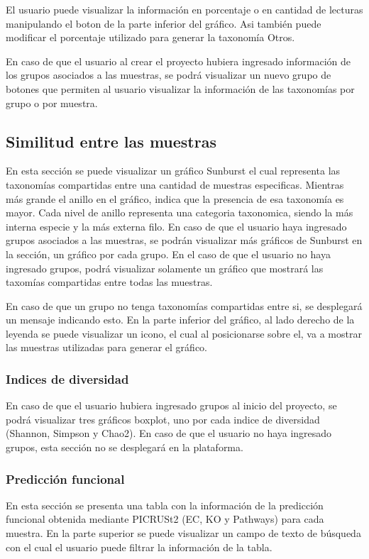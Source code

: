 El usuario puede visualizar la información en porcentaje o en cantidad de lecturas manipulando el boton de la parte inferior del gráfico. Asi también puede modificar el porcentaje utilizado para generar la taxonomía Otros.

En caso de que el usuario al crear el proyecto hubiera ingresado información de los grupos asociados a las muestras, se podrá visualizar un nuevo grupo de botones que permiten al usuario visualizar la información de las taxonomías por grupo o por muestra.
\subsection{Similitud entre las muestras}
En esta sección se puede visualizar un gráfico Sunburst el cual representa las taxonomías compartidas entre una cantidad de muestras especificas. Mientras más grande el anillo en el gráfico, indica que la presencia de esa taxonomía es mayor. Cada nivel de anillo representa una categoria taxonomica, siendo la más interna especie y la más externa filo.
En caso de que el usuario haya ingresado grupos asociados a las muestras, se podrán visualizar más gráficos de Sunburst en la sección, un gráfico por cada grupo. En el caso de que el usuario no haya ingresado grupos, podrá visualizar solamente un gráfico que mostrará las taxomías compartidas entre todas las muestras.

En caso de que un grupo no tenga taxonomías compartidas entre si, se desplegará un mensaje indicando esto.
En la parte inferior del gráfico, al lado derecho de la leyenda se puede visualizar un icono, el cual al posicionarse sobre el, va a mostrar las muestras utilizadas para generar el gráfico.
\subsubsection{Indices de diversidad}
En caso de que el usuario hubiera ingresado grupos al inicio del proyecto, se podrá visualizar tres gráficos boxplot, uno por cada indice de diversidad (Shannon, Simpson y Chao2). En caso de que el usuario no haya ingresado grupos, esta sección no se desplegará en la plataforma.
\subsubsection{Predicción funcional}
En esta sección se presenta una tabla con la información de la predicción funcional obtenida mediante PICRUSt2 (EC, KO y Pathways) para cada muestra. En la parte superior se puede visualizar un campo de texto de búsqueda con el cual el usuario puede filtrar la información de la tabla.

